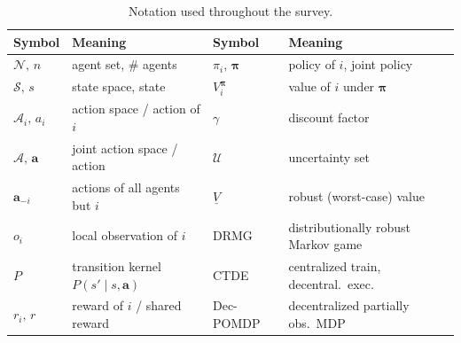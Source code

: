 \begin{table}[t]\centering\footnotesize
\caption{Notation used throughout the survey.}
\label{tab:notation}
\begin{tabular}{@{}ll@{\qquad}ll@{}}
\toprule
Symbol & Meaning & Symbol & Meaning \\
\midrule
$\mathcal{N},\,n$ & agent set, \# agents & $\pi_i,\,\boldsymbol{\pi}$ & policy of $i$, joint policy \\
$\mathcal{S},\,s$ & state space, state & $V_i^{\boldsymbol{\pi}}$ & value of $i$ under $\boldsymbol{\pi}$ \\
$\mathcal{A}_i,\,a_i$ & action space / action of $i$ & $\gamma$ & discount factor \\
$\mathcal{A},\,\mathbf{a}$ & joint action space / action & $\mathcal{U}$ & uncertainty set \\
$\mathbf{a}_{-i}$ & actions of all agents but $i$ & $\underline{V}$ & robust (worst-case) value \\
$o_i$ & local observation of $i$ & DRMG & distributionally robust Markov game \\
$P$ & transition kernel $P(s'\!\mid\! s,\mathbf{a})$ & CTDE & centralized train, decentral.\ exec. \\
$r_i,\,r$ & reward of $i$ / shared reward & Dec-POMDP & decentralized partially obs.\ MDP \\
\bottomrule
\end{tabular}
\end{table}
